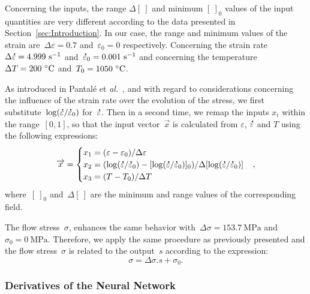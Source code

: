 \documentclass[algorithms,article,submit,pdftex,oneauthors]{Definitions/mdpi}
\makeatletter
\DeclareRobustCommand{\mdot}[1]{\accentset{\mbox{\bfseries .}}{#1}}
\DeclareRobustCommand{\eal}{et \emph{al.}\@\xspace}
\DeclareRobustCommand{\ps}{\text{s}^{-1}}
\DeclareRobustCommand{\MPa}{\text{MPa}}
\makeatother
\begin{document}
Concerning the inputs, the range $\Delta[~]$ and minimum $[~]_{0}$ values of the input quantities are very different according to the data presented in Section~\ref{sec:Introduction}.
In our case, the range and minimum values of the strain are~$\Delta\varepsilon=0.7$ and~$\varepsilon_{0}=0$ respectively.
Concerning the strain rate~$\Delta\mdot{\varepsilon}=4.999~\ps$ and~$\mdot{\varepsilon}_{0}=0.001~\ps$ and concerning the temperature~$\Delta T=200~\celsius$ and~$T_{0}=1050~\celsius$.

As introduced in Pantalé \eal~\cite{Pantale-2021-EIN}, and with regard to considerations concerning the influence of the strain rate over the evolution of the stress, we first substitute~$\log(\mdot{\varepsilon}/\mdot{\varepsilon}_{0})$ for~$\mdot{\varepsilon}$.
Then in a second time, we remap the inputs $x_i$ within the range~$[0,1]$, so that the input vector~$\overrightarrow{x}$ is calculated from $\varepsilon$, $\mdot{\varepsilon}$ and $T$ using the following expressions:
\begin{equation}
\overrightarrow{x}=
\begin{cases}
x_{1} = \left(\varepsilon - \varepsilon_{0}\right)/\Delta\varepsilon \\
x_{2} = \left(\log(\mdot{\varepsilon}/\mdot{\varepsilon}_{0})-[\log(\mdot{\varepsilon}/\mdot{\varepsilon}_{0})]_{0}\right)/\Delta[\log(\mdot{\varepsilon}/\mdot{\varepsilon}_{0})]\\
x_{3} = \left(T-T_{0}\right)/\Delta T
\end{cases},
\label{eq:ANN-input}
\end{equation}
where~$[~]_{0}$ and~$\Delta[~]$ are the minimum and range values of the corresponding field.

The flow stress~$\sigma$, enhances the same behavior with~$\Delta\sigma=153.7~\MPa$ and~$\sigma_{0}=0~\MPa$.
Therefore, we apply the same procedure as previously presented and the flow stress~$\sigma$ is related to the output~$s$ according to the expression:
\begin{equation}
\sigma = \Delta\sigma.s + \sigma_{0}.\label{eq:ANN-output}
\end{equation}

\subsubsection{Derivatives of the Neural Network}\label{subsubsec:ANN-der}
\end{document}

